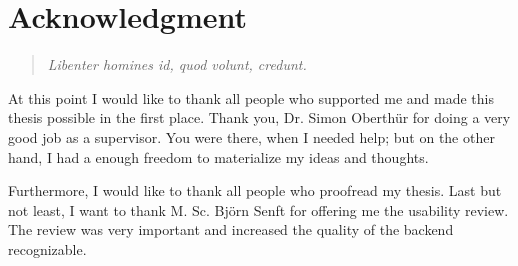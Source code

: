 





\begingroup
\let\clearpage\relax
\let\cleardoublepage\relax
\let\cleardoublepage\relax
\chapter*{Acknowledgment}

  \begin{verse}
    \textit{Libenter homines id, quod volunt, credunt.}\\
  \end{verse}

\hspace{3cm}

At this point I would like to thank all people who supported me and made this thesis possible 
in the first place. Thank you, Dr. Simon Oberth\"ur for doing a very good job as a supervisor. You were there, when I needed help; but on the other hand, I had a enough freedom to materialize my ideas and thoughts.

Furthermore, I would like to thank all people who proofread my thesis. Last but not least, I want to thank M. Sc. Bj\"orn Senft for offering me the usability review. The review was very important and increased the quality of the backend recognizable. 


\endgroup



